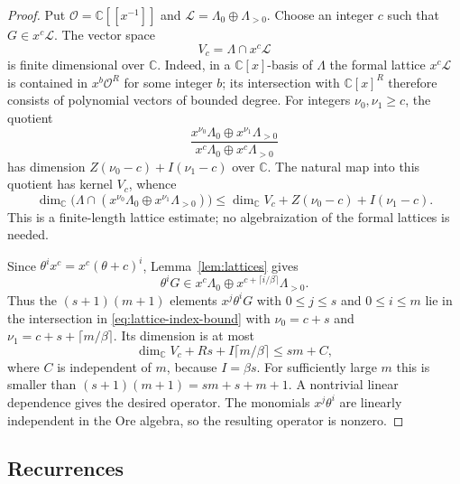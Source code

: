 \documentclass[11pt]{amsart}
\theoremstyle{definition}
\newcommand{\C}{\mathbb C}
\begin{document}
\begin{proof}
Put $\mathcal O=\C[[x^{-1}]]$ and
$\mathcal L=\Lambda_0\oplus\Lambda_{>0}$.  Choose an integer $c$ such that
$G\in x^c\mathcal L$.  The vector space
\[
 V_c=\Lambda\cap x^c\mathcal L
\]
is finite dimensional over $\C$.  Indeed, in a $\C[x]$-basis of $\Lambda$
the formal lattice $x^c\mathcal L$ is contained in
$x^b\mathcal O^R$ for some integer $b$; its intersection with
$\C[x]^R$ therefore consists of polynomial vectors of bounded degree.
For integers $\nu_0,\nu_1\ge c$, the quotient
\[
 \frac{x^{\nu_0}\Lambda_0\oplus x^{\nu_1}\Lambda_{>0}}
 {x^c\Lambda_0\oplus x^c\Lambda_{>0}}
\]
has dimension $Z(\nu_0-c)+I(\nu_1-c)$ over $\C$.
The natural map into this quotient has kernel $V_c$, whence
\begin{equation}\label{eq:lattice-index-bound}
 \dim_\C\bigl(\Lambda\cap
   (x^{\nu_0}\Lambda_0\oplus x^{\nu_1}\Lambda_{>0})\bigr)
 \le \dim_\C V_c+Z(\nu_0-c)+I(\nu_1-c).
\end{equation}
This is a finite-length lattice estimate; no algebraization of the formal
lattices is needed.

Since $\theta^i x^c=x^c(\theta+c)^i$, Lemma~\ref{lem:lattices} gives
\[
 \theta^iG\in x^c\Lambda_0\oplus
 x^{c+\lceil i/\beta\rceil}\Lambda_{>0}.
\]
Thus the $(s+1)(m+1)$ elements $x^j\theta^iG$ with
$0\le j\le s$ and $0\le i\le m$ lie in the intersection in
\eqref{eq:lattice-index-bound} with
$\nu_0=c+s$ and $\nu_1=c+s+\lceil m/\beta\rceil$.
Its dimension is at most
\[
 \dim_\C V_c+Rs+I\lceil m/\beta\rceil
 \le sm+C,
\]
where $C$ is independent of $m$, because $I=\beta s$.
For sufficiently large $m$ this is smaller than
$(s+1)(m+1)=sm+s+m+1$.  A nontrivial linear dependence gives the desired
operator.  The monomials $x^j\theta^i$ are linearly independent in the
Ore algebra, so the resulting operator is nonzero.
\end{proof}

\subsection{Recurrences}
\end{document}
